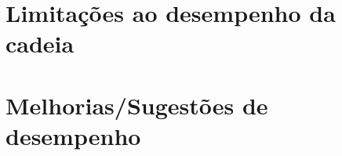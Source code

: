 \chapter{Limitações ao desempenho da cadeia}







\chapter{Melhorias/Sugestões de desempenho }






